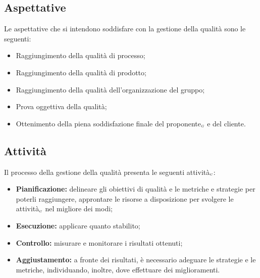 \subsection{Aspettative} \label{ProcessiDiSupportoGestioneDellaQualitàAspettative}
Le aspettative che si intendono soddisfare con la gestione della qualità sono le seguenti:
\begin{itemize}
	\item Raggiungimento della qualità di processo;
	\item Raggiungimento della qualità di prodotto;
	\item Raggiungimento della qualità dell’organizzazione del gruppo;
	\item Prova oggettiva della qualità;
	\item Ottenimento della piena soddisfazione finale del proponente$_{\scaleto{G}{3pt}}$ e del cliente.
\end{itemize}
\subsection{Attività} \label{ProcessiDiSupportoGestioneDellaQualitàAttività}
Il processo della gestione della qualità presenta le seguenti attività$_{\scaleto{G}{3pt}}$:
\begin{itemize}
	\item \textbf{Pianificazione:} delineare gli obiettivi di qualità e le metriche e strategie per poterli raggiungere, approntare le risorse a disposizione per svolgere le attività$_{\scaleto{G}{3pt}}$ nel migliore dei modi;
	\item \textbf{Esecuzione:} applicare quanto stabilito;
	\item \textbf{Controllo:} misurare e monitorare i risultati ottenuti;
	\item \textbf{Aggiustamento:} a fronte dei risultati, è necessario adeguare le strategie e le metriche, individuando, inoltre, dove effettuare dei miglioramenti.
\end{itemize}
